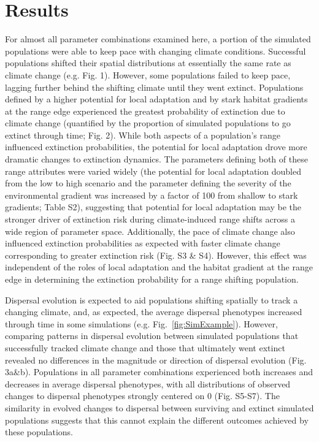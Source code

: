 \documentclass[12pt, oneside]{article}
\begin{document}
\section*{Results}
For almost all parameter combinations examined here, a portion of the simulated populations were able to keep pace with changing climate conditions. Successful populations shifted their spatial distributions at essentially the same rate as climate change (e.g. Fig. 1). However, some populations failed to keep pace, lagging further behind the shifting climate until they went extinct. Populations defined by a higher potential for local adaptation and by stark habitat gradients at the range edge experienced the greatest probability of extinction due to climate change (quantified by the proportion of simulated populations to go extinct through time; Fig. 2). While both aspects of a population's range influenced extinction probabilities, the potential for local adaptation drove more dramatic changes to extinction dynamics. The parameters defining both of these range attributes were varied widely (the potential for local adaptation doubled from the low to high scenario and the parameter defining the severity of the environmental gradient was increased by a factor of 100 from shallow to stark gradients; Table S2), suggesting that potential for local adaptation may be the stronger driver of extinction risk during climate-induced range shifts across a wide region of parameter space. Additionally, the pace of climate change also influenced extinction probabilities as expected with faster climate change corresponding to greater extinction risk (Fig. S3 \& S4). However, this effect was independent of the roles of local adaptation and the habitat gradient at the range edge in determining the extinction probability for a range shifting population.

Dispersal evolution is expected to aid populations shifting spatially to track a changing climate, and, as expected, the average dispersal phenotypes increased through time in some simulations (e.g. Fig.~\ref{fig:SimExample}). However, comparing patterns in dispersal evolution between simulated populations that successfully tracked climate change and those that ultimately went extinct revealed no differences in the magnitude or direction of dispersal evolution (Fig. 3a\&b). Populations in all parameter combinations experienced both increases and decreases in average dispersal phenotypes, with all distributions of observed changes to dispersal phenotypes strongly centered on $0$ (Fig. S5-S7). The similarity in evolved changes to dispersal between surviving and extinct simulated populations suggests that this cannot explain the different outcomes achieved by these populations.
\end{document}
